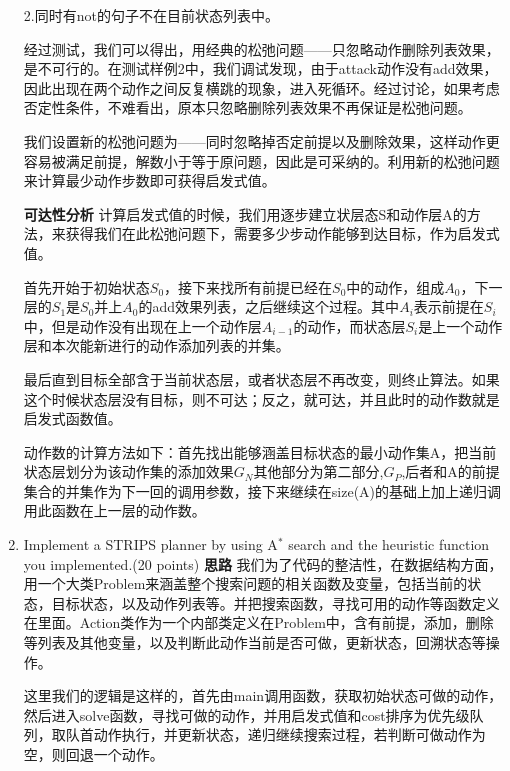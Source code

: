 \documentclass[a4paper, 11pt]{article}
\begin{document}
\begin{enumerate}
    	2.同时有not的句子不在目前状态列表中。
    	
    经过测试，我们可以得出，用经典的松弛问题——只忽略动作删除列表效果，是不可行的。在测试样例2中，我们调试发现，由于attack动作没有add效果，因此出现在两个动作之间反复横跳的现象，进入死循环。经过讨论，如果考虑否定性条件，不难看出，原本只忽略删除列表效果不再保证是松弛问题。
    
    我们设置新的松弛问题为——同时忽略掉否定前提以及删除效果，这样动作更容易被满足前提，解数小于等于原问题，因此是可采纳的。利用新的松弛问题来计算最少动作步数即可获得启发式值。\newline
    
    \textbf{可达性分析}
    计算启发式值的时候，我们用逐步建立状层态S和动作层A的方法，来获得我们在此松弛问题下，需要多少步动作能够到达目标，作为启发式值。
    
    首先开始于初始状态$S_0$，接下来找所有前提已经在$S_0$中的动作，组成$A_0$，下一层的$S_1$是$S_0$并上$A_0$的add效果列表，之后继续这个过程。其中$A_i$表示前提在$S_i$中，但是动作没有出现在上一个动作层$A_{i-1}$的动作，而状态层$S_i$是上一个动作层和本次能新进行的动作添加列表的并集。
    
    最后直到目标全部含于当前状态层，或者状态层不再改变，则终止算法。如果这个时候状态层没有目标，则不可达；反之，就可达，并且此时的动作数就是启发式函数值。
    
    动作数的计算方法如下：首先找出能够涵盖目标状态的最小动作集A，把当前状态层划分为该动作集的添加效果$G_N$其他部分为第二部分,$G_P$,后者和A的前提集合的并集作为下一回的调用参数，接下来继续在size(A)的基础上加上递归调用此函数在上一层的动作数。
        

\item Implement a STRIPS planner by using A$^*$ search and the heuristic function you implemented.(20 points)
	\newline\textbf{思路}
	我们为了代码的整洁性，在数据结构方面，用一个大类Problem来涵盖整个搜索问题的相关函数及变量，包括当前的状态，目标状态，以及动作列表等。并把搜索函数，寻找可用的动作等函数定义在里面。Action类作为一个内部类定义在Problem中，含有前提，添加，删除等列表及其他变量，以及判断此动作当前是否可做，更新状态，回溯状态等操作。
	
	这里我们的逻辑是这样的，首先由main调用函数，获取初始状态可做的动作，然后进入solve函数，寻找可做的动作，并用启发式值和cost排序为优先级队列，取队首动作执行，并更新状态，递归继续搜索过程，若判断可做动作为空，则回退一个动作。
	

\end{enumerate}
\end{document}
